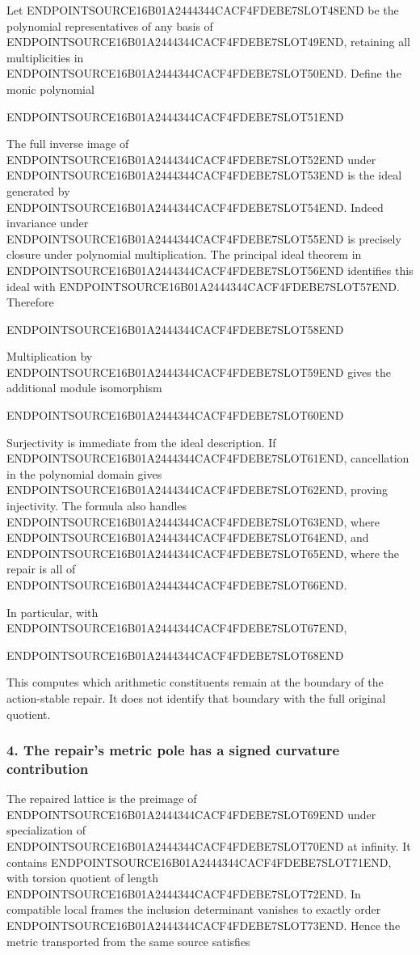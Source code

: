 Let ENDPOINTSOURCE16B01A2444344CACF4FDEBE7SLOT48END be the polynomial representatives of any basis of ENDPOINTSOURCE16B01A2444344CACF4FDEBE7SLOT49END, retaining all multiplicities in ENDPOINTSOURCE16B01A2444344CACF4FDEBE7SLOT50END. Define the monic polynomial

ENDPOINTSOURCE16B01A2444344CACF4FDEBE7SLOT51END

The full inverse image of ENDPOINTSOURCE16B01A2444344CACF4FDEBE7SLOT52END under ENDPOINTSOURCE16B01A2444344CACF4FDEBE7SLOT53END is the ideal generated by ENDPOINTSOURCE16B01A2444344CACF4FDEBE7SLOT54END. Indeed invariance under ENDPOINTSOURCE16B01A2444344CACF4FDEBE7SLOT55END is precisely closure under polynomial multiplication. The principal ideal theorem in ENDPOINTSOURCE16B01A2444344CACF4FDEBE7SLOT56END identifies this ideal with ENDPOINTSOURCE16B01A2444344CACF4FDEBE7SLOT57END. Therefore

ENDPOINTSOURCE16B01A2444344CACF4FDEBE7SLOT58END

Multiplication by ENDPOINTSOURCE16B01A2444344CACF4FDEBE7SLOT59END gives the additional module isomorphism

ENDPOINTSOURCE16B01A2444344CACF4FDEBE7SLOT60END

Surjectivity is immediate from the ideal description. If ENDPOINTSOURCE16B01A2444344CACF4FDEBE7SLOT61END, cancellation in the polynomial domain gives ENDPOINTSOURCE16B01A2444344CACF4FDEBE7SLOT62END, proving injectivity. The formula also handles ENDPOINTSOURCE16B01A2444344CACF4FDEBE7SLOT63END, where ENDPOINTSOURCE16B01A2444344CACF4FDEBE7SLOT64END, and ENDPOINTSOURCE16B01A2444344CACF4FDEBE7SLOT65END, where the repair is all of ENDPOINTSOURCE16B01A2444344CACF4FDEBE7SLOT66END.

In particular, with ENDPOINTSOURCE16B01A2444344CACF4FDEBE7SLOT67END,

ENDPOINTSOURCE16B01A2444344CACF4FDEBE7SLOT68END

This computes which arithmetic constituents remain at the boundary of the action-stable repair. It does not identify that boundary with the full original quotient.

\subsubsection{4. The repair's metric pole has a signed curvature contribution}\label{endpoint-cc_specialization--the-repairs-metric-pole-has-a-signed-curvature-contribution}

The repaired lattice is the preimage of ENDPOINTSOURCE16B01A2444344CACF4FDEBE7SLOT69END under specialization of ENDPOINTSOURCE16B01A2444344CACF4FDEBE7SLOT70END at infinity. It contains ENDPOINTSOURCE16B01A2444344CACF4FDEBE7SLOT71END, with torsion quotient of length ENDPOINTSOURCE16B01A2444344CACF4FDEBE7SLOT72END. In compatible local frames the inclusion determinant vanishes to exactly order ENDPOINTSOURCE16B01A2444344CACF4FDEBE7SLOT73END. Hence the metric transported from the same source satisfies

